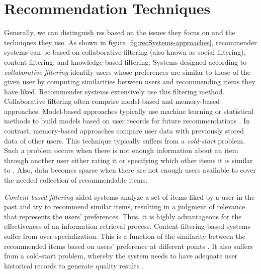 \section{Recommendation Techniques}
Generally, we can distinguish \Glspl{rs}  based on the issues they focus on and the techniques they use. As shown in figure \ref{fig:recSystems-approaches}, recommender systems can be based on collaborative filtering (also known as social filtering), content-filtering, and knowledge-based filtering.
Systems designed according to \textit{collaborative filtering} identify users whose preferences are similar to those of the given user by computing similarities between users and recommending items they have liked\parencite{Balabanovic1997Content-BasedRecommendation}. Recommender systems extensively use this filtering method. Collaborative filtering often comprise model-based and memory-based approaches. Model-based approaches typically use machine learning or statistical methods to build models based on user records for future recommendations \parencite{Chu2012DoesImages}. In contrast, memory-based approaches compare user data with previously stored data of other users\parencite{Schiaffino2006PoliteAgents}. This technique typically suffers from a \textit{cold-start} problem. Such a problem occurs when there is not enough information about an item through another user 
either rating it or specifying which other items it is similar to \parencite{Balabanovic1997Content-BasedRecommendation}. Also, data becomes sparse when there are not enough users available to cover the needed collection of recommendable items.

\textit{Content-based filtering} aided systems\parencite{LianContent-awareData, GaoContent-awareNetworks} analyze a set of items liked by a user in the past and try to recommend similar items, resulting in a judgment of relevance that represents the users' preferences. Thus, it is highly advantageous for the effectiveness of an information retrieval process. Content-filtering-based systems suffer from over-specialization. This is a function of the similarity between the recommended items based on users' preference at different points \parencite{Lops2011Content-basedTrends}. It also suffers from a cold-start problem, whereby the system needs to have adequate user historical records to generate quality results \parencite{Burke2002HybridInteraction}. 

